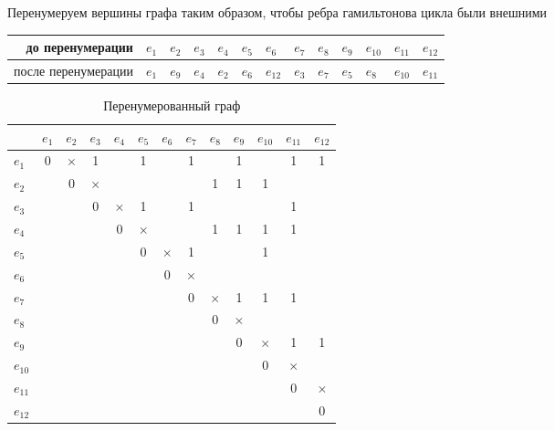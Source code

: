 \documentclass[a4paper,12pt]{article}
\begin{document}
    \pagebreak
    \begin{samepage}
        Перенумеруем вершины графа таким образом, чтобы ребра гамильтонова цикла были внешними
        \begin{table}[H]
            \begin{tabular}{|r*{12}{|l}|}
                \hline до перенумерации&$e_{1}$&$e_{2}$&$e_{3}$&$e_{4}$&$e_{5}$&$e_{6}$&$e_{7}$&$e_{8}$&$e_{9}$&$e_{10}$&$e_{11}$&$e_{12}$\\
                \hline после перенумерации&$e_{1}$&$e_{9}$&$e_{4}$&$e_{2}$&$e_{6}$&$e_{12}$&$e_{3}$&$e_{7}$&$e_{5}$&$e_{8}$&$e_{10}$&$e_{11}$\\
                \hline
            \end{tabular}
        \end{table}
    \end{samepage}

    \begin{table}[H]
        \centering
        \caption{Перенумерованный граф}
        \begin{tabular}{l*{3}{|cccc}}
            &$e_{1}$&$e_{2}$&$e_{3}$&$e_{4}$&$e_{5}$&$e_{6}$&$e_{7}$&$e_{8}$&$e_{9}$&$e_{10}$&$e_{11}$&$e_{12}$\\
            \hline
            $e_{1}$&0&$\times$&1&&1&&1&&1&&1&1\\
            $e_{2}$&&0&$\times$&&&&&1&1&1&&\\
            $e_{3}$&&&0&$\times$&1&&1&&&&1&\\
            $e_{4}$&&&&0&$\times$&&&1&1&1&1&\\
            \hline
            $e_{5}$&&&&&0&$\times$&1&&&1&&\\
            $e_{6}$&&&&&&0&$\times$&&&&&\\
            $e_{7}$&&&&&&&0&$\times$&1&1&1&\\
            $e_{8}$&&&&&&&&0&$\times$&&&\\
            \hline
            $e_{9}$&&&&&&&&&0&$\times$&1&1\\
            $e_{10}$&&&&&&&&&&0&$\times$&\\
            $e_{11}$&&&&&&&&&&&0&$\times$\\
            $e_{12}$&&&&&&&&&&&&0\\
        \end{tabular}
    \end{table}
\end{document}
